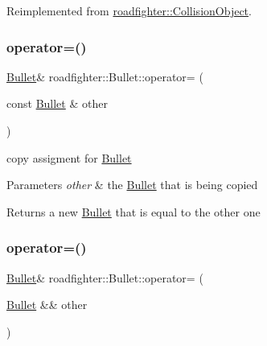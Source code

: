 Reimplemented from \hyperlink{classroadfighter_1_1CollisionObject_a738071cd7b1b8cd4c8d455b5e552bd4c}{roadfighter\+::\+Collision\+Object}.

\mbox{\label{classroadfighter_1_1Bullet_ab507000db2f726b8906ced3ea4c7782f}} 
\subsubsection{\texorpdfstring{operator=()}{operator=()}\hspace{0.1cm}{\footnotesize\ttfamily [1/2]}}
{\footnotesize\ttfamily \hyperlink{classroadfighter_1_1Bullet}{Bullet}\& roadfighter\+::\+Bullet\+::operator= (\begin{DoxyParamCaption}\item[{const \hyperlink{classroadfighter_1_1Bullet}{Bullet} \&}]{other }\end{DoxyParamCaption})\hspace{0.3cm}{\ttfamily [default]}}

copy assigment for \hyperlink{classroadfighter_1_1Bullet}{Bullet} 
\begin{DoxyParams}{Parameters}
{\em other} & the \hyperlink{classroadfighter_1_1Bullet}{Bullet} that is being copied \\
\hline
\end{DoxyParams}
\begin{DoxyReturn}{Returns}
a new \hyperlink{classroadfighter_1_1Bullet}{Bullet} that is equal to the other one 
\end{DoxyReturn}
\mbox{\label{classroadfighter_1_1Bullet_a7c63a2a326738605af30ad850272d3b7}} 
\subsubsection{\texorpdfstring{operator=()}{operator=()}\hspace{0.1cm}{\footnotesize\ttfamily [2/2]}}
{\footnotesize\ttfamily \hyperlink{classroadfighter_1_1Bullet}{Bullet}\& roadfighter\+::\+Bullet\+::operator= (\begin{DoxyParamCaption}\item[{\hyperlink{classroadfighter_1_1Bullet}{Bullet} \&\&}]{other }\end{DoxyParamCaption})\hspace{0.3cm}{\ttfamily [default]}}

